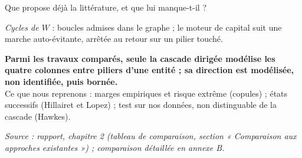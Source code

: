 \documentclass[aspectratio=169,10pt,t]{beamer}
\newcommand{\source}[1]{\par\vfill{\tiny\color{gris}\textit{Source : #1}}\par\vspace{-1mm}}
\begin{document}
\begin{frame}{Que propose déjà la littérature, et que lui manque-t-il ?}
{  \textit{Cycles de $W$} : boucles admises dans le graphe ; le moteur de capital suit une marche auto-évitante, arrêtée au retour sur un pilier touché.\par}
  \vspace{0.4mm}
  {\footnotesize\color{ardoise}\bfseries Parmi les travaux comparés, seule la cascade dirigée modélise les quatre colonnes entre piliers d'une entité ; sa direction est modélisée, non identifiée, puis bornée.}\\[0.4mm]
  {\tiny\color{gris}Ce que nous reprenons : marges empiriques et risque extrême (copules) ; états successifs (Hillairet et Lopez) ; test sur nos données, non distinguable de la cascade (Hawkes).}
  \source{rapport, chapitre 2 (tableau de comparaison, section « Comparaison aux approches existantes ») ; comparaison détaillée en annexe B.}
\end{frame}


\end{document}
